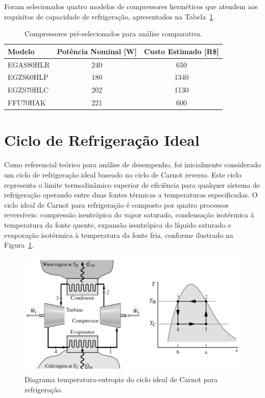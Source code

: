 Foram selecionados quatro modelos de compressores herméticos que atendem aos requisitos de capacidade de refrigeração, apresentados na Tabela~\ref{tab:compressores escolhidos}.

\begin{table}[ht]
\centering
\begin{tabular}{|l|c|c|}
\hline
\textbf{Modelo} & \textbf{Potência Nominal [W]} & \textbf{Custo Estimado [R\$]} \\ \hline
EGAS80HLR & 240 & 650 \\ \hline
EGZS60HLP & 180 & 1340 \\ \hline
EGZS70HLC & 202 & 1130 \\ \hline
FFU70HAK & 221 & 600 \\ \hline
\end{tabular}
\caption{Compressores pré-selecionados para análise comparativa.}
\label{tab:compressores escolhidos}
\end{table}

\newpage

\section{Ciclo de Refrigeração Ideal}

Como referencial teórico para análise de desempenho, foi inicialmente considerado um ciclo de refrigeração ideal baseado no ciclo de Carnot reverso. Este ciclo representa o limite termodinâmico superior de eficiência para qualquer sistema de refrigeração operando entre duas fontes térmicas a temperaturas especificadas. O ciclo ideal de Carnot para refrigeração é composto por quatro processos reversíveis: compressão isentrópica do vapor saturado, condensação isotérmica à temperatura da fonte quente, expansão isentrópica do líquido saturado e evaporação isotérmica à temperatura da fonte fria, conforme ilustrado na Figura~\ref{fig: ciclo ideal}.

\begin{figure}[ht]
    \centering
    \includegraphics[width=0.6\linewidth]{Imagens/Desenvolvimento/carnot.png}
    \caption{Diagrama temperatura-entropia do ciclo ideal de Carnot para refrigeração.}
    \label{fig: ciclo ideal}
\end{figure}

